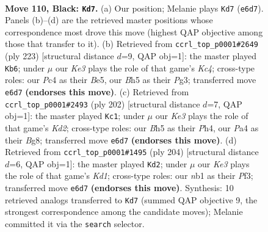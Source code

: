 \documentclass[11pt]{article}
\begin{document}
\clearpage

\begin{figure}[p]\centering
\begin{subfigure}{0.46\textwidth}\centering
\resizebox{\linewidth}{!}{%
\newchessgame
\chessboard[
  setfen={5B2/8/4k3/7b/p1p5/8/5K2/1N6 b - - 75 110},
  showmover=false,
  pgfstyle=straightmove, color=movearrow, markmove={e6-d7}
]}
\caption{}
\end{subfigure}\hfill
\begin{subfigure}{0.46\textwidth}\centering
\resizebox{\linewidth}{!}{%
\newchessgame
\chessboard[
  setfen={B7/8/8/2k1b3/8/6pp/8/5K2 b - - 65 112},
  showmover=false,
  pgfstyle=straightmove, color=movearrow, markmove={c5-b6}
]}
\caption{}
\end{subfigure}
\\[4pt]
\begin{subfigure}{0.46\textwidth}\centering
\resizebox{\linewidth}{!}{%
\newchessgame
\chessboard[
  setfen={6B1/8/8/7b/5k1P/8/3K4/8 w - - 7 102},
  showmover=false,
  pgfstyle=straightmove, color=movearrow, markmove={d2-c1}
]}
\caption{}
\end{subfigure}\hfill
\begin{subfigure}{0.46\textwidth}\centering
\resizebox{\linewidth}{!}{%
\newchessgame
\chessboard[
  setfen={4k3/8/8/4p3/8/5P2/B4b2/3K4 w - - 27 103},
  showmover=false,
  pgfstyle=straightmove, color=movearrow, markmove={d1-d2}
]}
\caption{}
\end{subfigure}
\caption{\textbf{Move 110, Black: \texttt{Kd7}.} (a) Our position; Melanie plays \texttt{Kd7} (\texttt{e6d7}). Panels (b)--(d) are the retrieved master positions whose correspondence most drove this move (highest QAP objective among those that transfer to it). (b) Retrieved from \texttt{ccrl\_top\_p0001\#2649} (ply 223) [structural distance $d$=9, QAP obj=1]: the master played \texttt{Kb6}; under $\mu$ our \emph{Ke3} plays the role of that game's \emph{Kc4}; cross-type roles: our \emph{P}c4 as their \emph{B}e5, our \emph{B}h5 as their \emph{P}g3; transferred move \texttt{e6d7} \textbf{(endorses this move)}. (c) Retrieved from \texttt{ccrl\_top\_p0001\#2493} (ply 202) [structural distance $d$=7, QAP obj=1]: the master played \texttt{Kc1}; under $\mu$ our \emph{Ke3} plays the role of that game's \emph{Kd2}; cross-type roles: our \emph{B}h5 as their \emph{P}h4, our \emph{P}a4 as their \emph{B}g8; transferred move \texttt{e6d7} \textbf{(endorses this move)}. (d) Retrieved from \texttt{ccrl\_top\_p0001\#1495} (ply 204) [structural distance $d$=6, QAP obj=1]: the master played \texttt{Kd2}; under $\mu$ our \emph{Ke3} plays the role of that game's \emph{Kd1}; cross-type roles: our \emph{n}b1 as their \emph{P}f3; transferred move \texttt{e6d7} \textbf{(endorses this move)}. Synthesis: 10 retrieved analogs transferred to \texttt{Kd7} (summed QAP objective 9, the strongest correspondence among the candidate moves); Melanie committed it via the \texttt{search} selector.}
\label{fig:thought-m219}
\end{figure}
\end{document}
